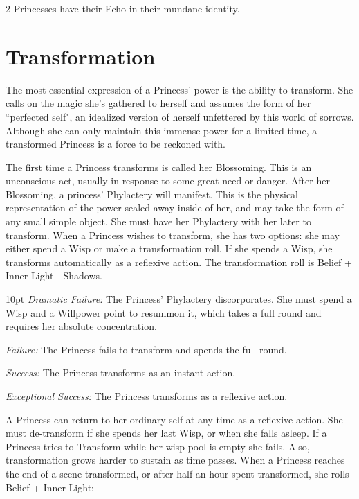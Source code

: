 \begin{multicols}{2}
Princesses have their Echo in their mundane identity. 

\section*{Transformation}
\label{sec:Transformation}
The most essential expression of a Princess' power is the ability to transform. She calls on the magic she's gathered to herself and assumes the form of her \textquotedblleft perfected self", an idealized version of herself unfettered by this world of sorrows. Although she can only maintain this immense power for a limited time, a transformed Princess is a force to be reckoned with.

The first time a Princess transforms is called her Blossoming. This is an unconscious act, usually in response to some great need or danger. After her Blossoming, a princess' Phylactery will manifest. This is the physical representation of the power sealed away inside of her, and may take the form of any small simple object. She must have her Phylactery with her later to transform. When a Princess wishes to transform, she has two options: she may either spend a Wisp or make a transformation roll. If she spends a Wisp, she transforms automatically as a reflexive action. The transformation roll is Belief + Inner Light - Shadows. 

\begin{myindentpar}{10pt}
    \emph{Dramatic Failure:} The Princess' Phylactery discorporates. She must spend a Wisp and a Willpower point to resummon it, which takes a full round and requires her absolute concentration. 
    
    \emph{Failure:} The Princess fails to transform and spends the full round. 
    
    \emph{Success:} The Princess transforms as an instant action. 
    
    \emph{Exceptional Success:} The Princess transforms as a reflexive action.
\end{myindentpar}

A Princess can return to her ordinary self at any time as a reflexive action. She must de-transform if she spends her last Wisp, or when she falls asleep. If a Princess tries to Transform while her wisp pool is empty she fails. Also, transformation grows harder to sustain as time passes. When a Princess reaches the end of a scene transformed, or after half an hour spent transformed, she rolls Belief + Inner Light: 


\end{multicols}
